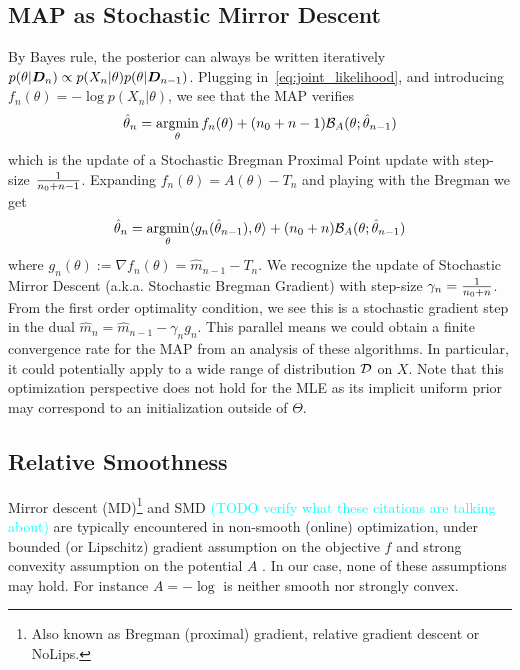 \documentclass[twoside]{article}
\newcommand{\TODO}[1]{\textcolor{cyan}{(TODO #1)}}
\newcommand{\logpart}{A}
\newcommand{\bregman}{\cB_\logpart}
\newcommand{\nat}{\theta}
\newcommand{\m}{m}
\newcommand{\lr}{\gamma} %
\begin{document}
\subsection{MAP as Stochastic Mirror Descent}
\label{ssec:MAP=SMD}
By Bayes rule, the posterior can always be written iteratively $p(\nat | \mD_n) \propto p(X_n | \nat) p(\nat | \mD_{n-1})$.
Plugging in~\eqref{eq:joint_likelihood}, and introducing $f_n(\nat) = - \log p(X_{n} | \nat)$, we see that the MAP verifies
\begin{align*}
	\hat \nat_{n}
	= \argmin_\nat f_n(\nat) + (n_0 + n -1) \bregman(\nat; \hat \nat_{n-1})
\end{align*}
which is the update of a Stochastic Bregman Proximal Point update with step-size $\frac{1}{n_0 + n - 1}$.
Expanding $f_n(\nat) = \logpart(\nat) - T_n$ and  playing with the Bregman we get
\begin{align*}
		\hat \nat_{n}
	= \argmin_\nat \langle g_{n}(\hat \nat_{n-1}), \nat \rangle + (n_0 + n) \bregman(\nat; \hat \nat_{n-1})
\end{align*}
where $g_{n}(\nat) := \nabla f_n(\nat) = \hat \m_{n-1} - T_n$.
We recognize the update of Stochastic Mirror Descent (a.k.a. Stochastic Bregman Gradient) with step-size $\lr_n = \inv{n_0 + n}$.
From the first order optimality condition, we see this is a stochastic gradient step in the dual $\hat \m_n = \hat \m_{n-1} - \lr_n g_n$.
This parallel means we could obtain a finite convergence rate for the  MAP from an analysis of these algorithms.
In particular, it could potentially apply to a wide range of distribution ${\mathcal D}$ on $X$.
Note that this optimization perspective does not hold for the MLE %
as its implicit uniform prior may correspond to an initialization outside of $\Theta$.

\subsection{Relative Smoothness}
Mirror descent (MD)\footnote{
Also known as
Bregman (proximal) gradient, relative gradient descent or NoLips.
}
\citep{nemirovski1983problem,beck2003mirror}
and SMD 
\citet{nemirovski2009robust,ghadimi2012optimal}  \TODO{verify what these citations are talking about} 
are typically encountered in non-smooth (online) optimization,
under bounded (or Lipschitz) gradient assumption on the objective $f$
and strong convexity assumption on the potential $\logpart$
\citep[Th.4.2 \& Th.6.3]{bubeck2015convex}.
In our case, none of these assumptions may hold. 
For instance $\logpart = -\log$ is neither smooth nor strongly convex.
\end{document}
